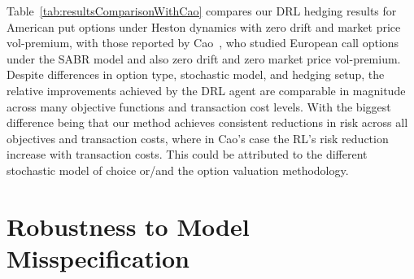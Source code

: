\documentclass[a4paper,fleqn]{cas-dc}
\begin{document}
Table~\ref{tab:resultsComparisonWithCao} compares our DRL hedging results for American put options under Heston dynamics with zero drift and market price vol-premium, with those reported by Cao~\cite{DH_1}, who studied European call options under the SABR model and also zero drift and zero market price vol-premium. Despite differences in option type, stochastic model, and hedging setup, the relative improvements achieved by the DRL agent are comparable in magnitude across many objective functions and transaction cost levels. With the biggest difference being that our method achieves consistent reductions in risk across all objectives and transaction costs, where in Cao's case the RL's risk reduction increase with transaction costs. This could be attributed to the different stochastic model of choice or/and the option valuation methodology.


\section{Robustness to Model Misspecification}
\label{sec:robustness}
\end{document}
